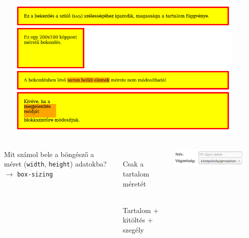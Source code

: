 \begin{frame}
  \begin{columns}[c]
      \begin{exampleblock}{}
        \tiny
        
      \end{exampleblock}
      \includegraphics[width=0.9\textwidth]{dobozMeret.png}
  \end{columns}
  \begin{exampleblock}{\vspace*{-3ex}}
    \tiny
    
  \end{exampleblock}
\end{frame}

\begin{frame}
\begin{columns}[c]
    Mit számol bele a böngésző a méret (\texttt{width}, 
    \texttt{height}) adatokba? $\to$ \texttt{box-sizing}
    \begin{description}[m]
      \item[\texttt{content-box}] \hfill \\ 
        Csak a tartalom méretét
      \item[\texttt{border-box}] \hfill \\ 
        Tartalom + kitöltés + szegély
    \end{description}
    \begin{center}
      \includegraphics[scale=0.5]{meretezes.png}
    \end{center}
    \begin{exampleblock}{}
      \scriptsize
      
    \end{exampleblock}
\end{columns} 
  
\end{frame}
